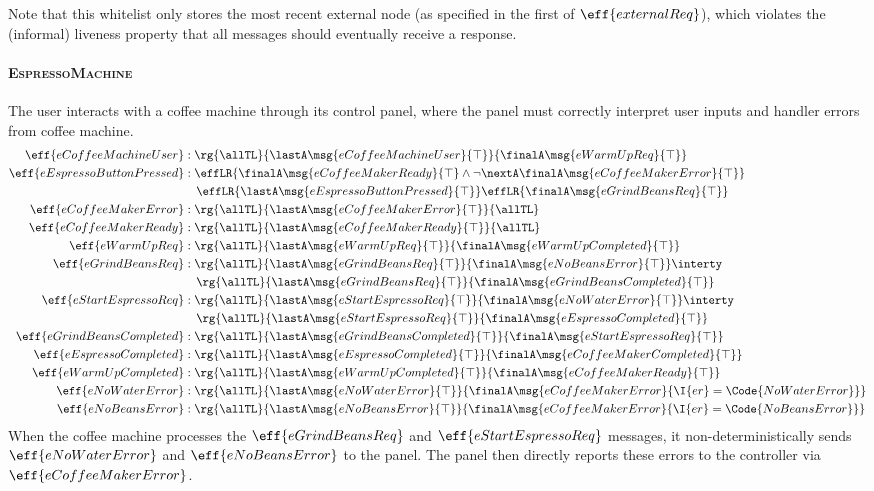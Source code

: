 Note that this whitelist only stores the most recent external node (as
specified in the first \PAT of \(\eff{externalReq}\)), which violates
the (informal) liveness property that all messages should eventually
receive a response.

\paragraph{\textsc{EspressoMachine}} The user interacts with a coffee machine through its control panel, where the panel must correctly interpret user inputs and handler errors from coffee machine.
{\small\begin{align*}
  \eff{eCoffeeMachineUser}&: \rg{\allTL}{\lastA\msg{eCoffeeMachineUser}{\top}}{\finalA\msg{eWarmUpReq}{\top}}
  \\\eff{eEspressoButtonPressed}&: \effLR{\finalA \msg{eCoffeeMakerReady}{\top} \land \neg\nextA\finalA \msg{eCoffeeMakerError}{\top}}
  \\&\quad \effLR{\lastA\msg{eEspressoButtonPressed}{\top}}\effLR{\finalA\msg{eGrindBeansReq}{\top}}
  \\\eff{eCoffeeMakerError}&: \rg{\allTL}{\lastA\msg{eCoffeeMakerError}{\top}}{\allTL}
  \\\eff{eCoffeeMakerReady}&: \rg{\allTL}{\lastA\msg{eCoffeeMakerReady}{\top}}{\allTL}
  \\\eff{eWarmUpReq}&: \rg{\allTL}{\lastA\msg{eWarmUpReq}{\top}}{\finalA\msg{eWarmUpCompleted}{\top}}
  \\\eff{eGrindBeansReq}&: \rg{\allTL}{\lastA\msg{eGrindBeansReq}{\top}}{\finalA\msg{eNoBeansError}{\top}} \interty
  \\&\quad \rg{\allTL}{\lastA\msg{eGrindBeansReq}{\top}}{\finalA\msg{eGrindBeansCompleted}{\top}}
  \\\eff{eStartEspressoReq}&: \rg{\allTL}{\lastA\msg{eStartEspressoReq}{\top}}{\finalA\msg{eNoWaterError}{\top}} \interty
  \\&\quad \rg{\allTL}{\lastA\msg{eStartEspressoReq}{\top}}{\finalA\msg{eEspressoCompleted}{\top}}
  \\\eff{eGrindBeansCompleted}&: \rg{\allTL}{\lastA\msg{eGrindBeansCompleted}{\top}}{\finalA\msg{eStartEspressoReq}{\top}}
  \\\eff{eEspressoCompleted}&: \rg{\allTL}{\lastA\msg{eEspressoCompleted}{\top}}{\finalA\msg{eCoffeeMakerCompleted}{\top}}
  \\\eff{eWarmUpCompleted}&: \rg{\allTL}{\lastA\msg{eWarmUpCompleted}{\top}}{\finalA\msg{eCoffeeMakerReady}{\top}}
  \\\eff{eNoWaterError}&: \rg{\allTL}{\lastA\msg{eNoWaterError}{\top}}{\finalA\msg{eCoffeeMakerError}{\I{er} = \Code{NoWaterError}}}
  \\\eff{eNoBeansError}&: \rg{\allTL}{\lastA\msg{eNoBeansError}{\top}}{\finalA\msg{eCoffeeMakerError}{\I{er} = \Code{NoBeansError}}}
\end{align*}}\noindent
When the coffee machine processes the \(\eff{eGrindBeansReq}\) and \(\eff{eStartEspressoReq}\) messages, it non-deterministically sends \(\eff{eNoWaterError}\) and \(\eff{eNoBeansError}\) to the panel. The panel then directly reports these errors to the controller via \(\eff{eCoffeeMakerError}\).


